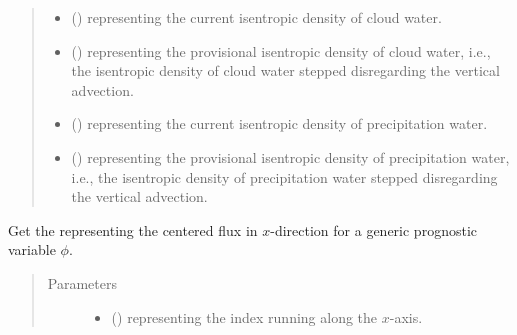 \documentclass[letterpaper,10pt,english]{sphinxmanual}
\begin{document}
\begin{fulllineitems}
\begin{fulllineitems}
\begin{quote}
\begin{description}
\begin{itemize}
\item {} 
 () \textendash{}  representing the current isentropic density of cloud water.

\item {} 
 () \textendash{}  representing the provisional isentropic density of cloud water,
i.e., the isentropic density of cloud water stepped disregarding the vertical advection.

\item {} 
 () \textendash{}  representing the current isentropic density of precipitation water.

\item {} 
 () \textendash{}  representing the provisional isentropic density of precipitation water,
i.e., the isentropic density of precipitation water stepped disregarding the vertical advection.

\end{itemize}

\end{description}\end{quote}

\end{fulllineitems}


\begin{fulllineitems}
\label{\detokenize{api:dycore.flux_isentropic_centered.FluxIsentropicCentered._get_centered_flux_x}}
Get the  representing the centered flux in \(x\)-direction
for a generic prognostic variable \(\phi\).
\begin{quote}\begin{description}
\item[{Parameters}] \leavevmode\begin{itemize}
\item {} 
 () \textendash{}  representing the index running along the \(x\)-axis.


\end{itemize}
\end{description}
\end{quote}
\end{fulllineitems}
\end{fulllineitems}
\end{document}

